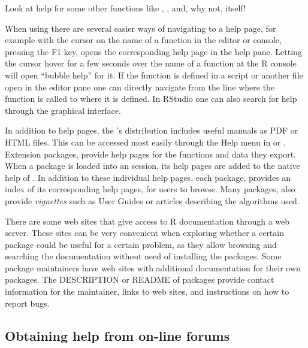 \documentclass[krantz2,ChapterTOCs]{krantz}\usepackage{knitr}
\begin{document}
\begin{playground}
Look at help for some other functions like , ,  and, why not,  itself!
\begin{knitrout}\footnotesize
{}\color{fgcolor}\begin{kframe}
\begin{alltt}
\end{alltt}
\end{kframe}
\end{knitrout}
\end{playground}

When using \RStudio there are several easier ways of navigating to a help page, for example with the cursor on the name of a function in the editor or console, pressing the F1 key, opens the corresponding help page in the help pane. Letting the cursor hover for a few seconds over the name of a function at the R console will open ``bubble help'' for it. If the function is defined in a script or another file open in the editor pane one can directly navigate from the line where the function is called to where it is defined. In RStudio one can also search for help through the graphical interface.

In addition to help pages, the 's distribution includes useful manuals as PDF or HTML files. This can be accessed most easily through the Help menu in \RStudio or . Extension packages, provide help pages for the functions and data they export. When a package is loaded into an  session, its help pages are added to the native help of . In addition to these individual help pages, each package, provides an index of its corresponding help pages, for users to browse. Many packages, also provide \emph{vignettes} such as User Guides or articles describing the algorithms used.

There are some web sites that give access to R documentation through a web server. These sites can be very convenient when exploring whether a certain package could be useful for a certain problem, as they allow browsing and searching the documentation without need of installing the packages. Some package maintainers have web sites with additional documentation for their own packages. The DESCRIPTION or README of packages provide contact information for the maintainer, links to web sites, and instructions on how to report bugs. 

\subsection{Obtaining help from on-line forums}
\end{document}
